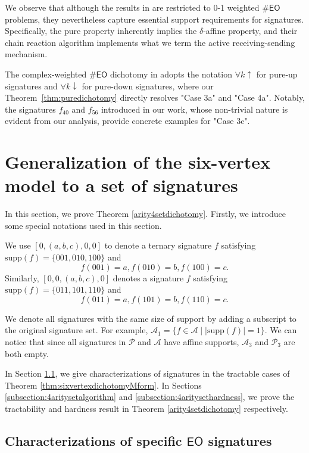 \documentclass[a4paper,UKenglish,cleveref, autoref, thm-restate]{lipics-v2021}
\newcommand{\eo}[0]{\textsf{EO}}
\newcommand{\su}[0]{\text{supp}}
\begin{document}
We observe that although the results in \cite{shao2024eulerian} are restricted to 0-1 weighted $\#\eo$ problems, they nevertheless capture essential support requirements for signatures. Specifically, the pure property inherently implies the $\delta$-affine property, and their chain reaction algorithm implements what we term the active receiving-sending mechanism.

The complex-weighted $\#\eo$ dichotomy in \cite{meng2025fpnp} adopts the notation $\forall k \uparrow$ for pure-up signatures and $\forall k \downarrow$ for pure-down signatures, where our Theorem~\ref{thm:puredichotomy} directly resolves "Case 3a" and "Case 4a". Notably, the signatures $f_{40}$ and $f_{56}$ introduced in our work, whose non-trivial nature is evident from our analysis, provide concrete examples for "Case 3c".
\section{Generalization of the six-vertex model to a set of signatures} \label{section: arity4set}




In this section, we prove Theorem \ref{arity4setdichotomy}. Firstly, we introduce some special notations used in this section.

We use $[0,(a,b,c),0,0]$ to denote a ternary signature $f$ satisfying $\su(f)=\{001,010,100\}$ and 
$$f(001)=a,f(010)=b,f(100)=c.$$ 
Similarly, $[0,0,(a,b,c),0]$ denotes a signature $f$ satisfying $\su(f)=\{011,101,110\}$ and 
$$f(011)=a,f(101)=b,f(110)=c.$$

We denote all signatures with the same size of support by adding a subscript to the original signature set. For example, $\mathscr{A}_1=\{f\in\mathscr{A}\mid|\su(f)|=1\}$. We can notice that since all signatures in $\mathscr{P}$ and $\mathscr{A}$ have affine supports, $\mathscr{A}_3$ and $\mathscr{P}_3$ are both empty.

In Section \ref{Characterizations}, we give characterizations of signatures in the tractable cases of Theorem \ref{thm:sixvertexdichotomyMform}. In Sections \ref{subsection:4aritysetalgorithm} and \ref{subsection:4aritysethardness}, we prove the tractability and hardness result in Theorem \ref{arity4setdichotomy} respectively.

\subsection{Characterizations of specific $\eo$ signatures}\label{Characterizations}
\end{document}
